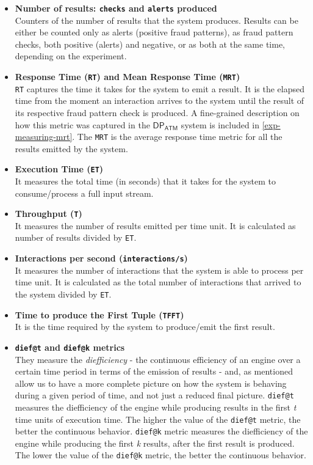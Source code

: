 \documentclass[12pt,a4paper]{article}
\newcommand{\DPATM}{$\mathsf{DP_{ATM}}$ }
\begin{document}
\begin{itemize}
    \item \textbf{Number of results: \texttt{checks} and \texttt{alerts} produced\\}
    Counters of the number of results that the system produces. Results can be either be counted only as alerts (positive fraud patterns), as fraud pattern checks, both positive (alerts) and negative, or as both at the same time, depending on the experiment. 
    \item \textbf{Response Time (\texttt{RT}) and Mean Response Time (\texttt{MRT})\\}
    \texttt{RT} captures the time it takes for the system to emit a result. It is the elapsed time from the moment an interaction arrives to the system until the result of its respective fraud pattern check is produced. A fine-grained description on how this metric was captured in the \DPATM system is included in \ref{exp-measuring-mrt}. The \texttt{MRT} is the average response time metric for all the results emitted by the system.
    \item \textbf{Execution Time (\texttt{ET})\\}
    It measures the total time (in seconds) that it takes for the system to consume/process a full input stream.
    \item \textbf{Throughput (\texttt{T})\\}
    It measures the number of results emitted per time unit. It is calculated as number of results divided by \texttt{ET}.
    \item \textbf{Interactions per second (\texttt{interactions/s})\\}
    It measures the number of interactions that the system is able to process per time unit. It is calculated as the total number of interactions that arrived to the system divided by \texttt{ET}.
    \item \textbf{Time to produce the First Tuple (\texttt{TFFT})\\}
    It is the time required by the system to produce/emit the first result.
    \item \textbf{\texttt{dief@t} and \texttt{dief@k} metrics\\}
    They measure the \emph{diefficiency} - the continuous efficiency of an engine over a certain time period in terms of the emission of results - and, as mentioned allow us to have a more complete picture on how the system is behaving during a given period of time, and not just a reduced final picture. \texttt{dief@t} measures the diefficiency of the engine while producing results in the first \emph{t} time units of execution time. The higher the value of the \texttt{dief@t} metric, the better the continuous behavior. \texttt{dief@k} metric measures the diefficiency of the engine while producing the first \emph{k} results, after the first result is produced. The lower the value of the \texttt{dief@k} metric, the better the continuous behavior.


\end{itemize}
\end{document}
